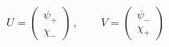 \begin{equation}
U=\left( \begin{array}{c} \psi_+ \\ \chi_- \end{array} \right)
\,,\qquad 
V=\left( \begin{array}{c} \psi_- \\ \chi_+ \end{array} \right)
\label{defUV}
\end{equation}

